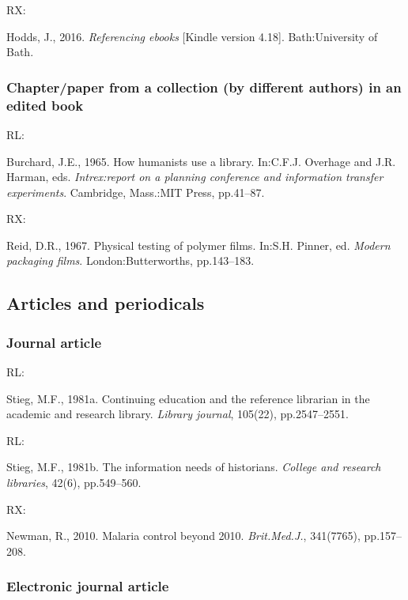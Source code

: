 RX: \cite{hodds2016re}

Hodds, J., 2016. \emph{Referencing ebooks} [Kindle version 4.18]. Bath:\@ University of Bath.



\subsubsection*{Chapter\slash paper from a collection (by different authors) in an edited book}

RL: \cite{burchard1965hhl}

Burchard, J.E., 1965. How humanists use a library. In:\@ C.F.J. Overhage and J.R. Harman, eds. \emph{Intrex:\@ report on a planning conference and information transfer experiments}. Cambridge, Mass.:\@ MIT Press, pp.41--87.


RX: \cite{reid1967ptp}

Reid, D.R., 1967. Physical testing of polymer films. In:\@ S.H. Pinner, ed. \emph{Modern packaging films}. London:\@ Butterworths, pp.143--183.



\subsection{Articles and periodicals}

\subsubsection*{Journal article}

RL: \cite{stieg1981cer}

Stieg, M.F., 1981a. Continuing education and the reference librarian in the academic and research library. \emph{Library journal}, 105(22), pp.2547--2551.

RL: \cite{stieg1981inh}

Stieg, M.F., 1981b. The information needs of historians. \emph{College and research libraries}, 42(6), pp.549--560.


RX: \cite{newman2010mcb}

Newman, R., 2010. Malaria control beyond 2010. \emph{Brit.\@ Med.\@ J.}, 341(7765), pp.157--208.



\subsubsection*{Electronic journal article}

